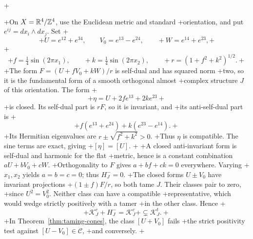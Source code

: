 +\begin{example}\label{ex:strict-cones}
+On \(X=\mathbb R^4/\mathbb Z^4\), use the Euclidean metric and standard
+orientation, and put \(e^{ij}=dx_i\wedge dx_j\). Set
+\[
+ U=e^{12}+e^{34},\qquad V_0=e^{13}-e^{24},\qquad
+ W=e^{14}+e^{23},
+\]
+\[
+ f=\tfrac14\sin(2\pi x_1),\qquad
+ k=\tfrac14\sin(2\pi x_2),\qquad
+ r=(1+f^2+k^2)^{1/2}.
+\]
+The form \(F=(U+fV_0+kW)/r\) is self-dual and has squared norm
+two, so it is the fundamental form of a smooth orthogonal almost
+complex structure \(J\) of this orientation. The form
+\[
+ \eta=U+2f e^{13}+2k e^{23}
+\]
+is closed. Its self-dual part is \(rF\), so it is invariant, and
+its anti-self-dual part is
+\[
+ f(e^{13}+e^{24})+k(e^{23}-e^{14}).
+\]
+Its Hermitian eigenvalues are \(r\pm\sqrt{f^2+k^2}>0\).
+Thus \(\eta\) is compatible. The sine terms are exact, giving
+\([\eta]=[U]\).
+
+A closed anti-invariant form is self-dual and harmonic for the flat
+metric, hence is a constant combination \(aU+bV_0+cW\).
+Orthogonality to \(F\) gives \(a+bf+ck=0\) everywhere. Varying
+\(x_1,x_2\) yields \(a=b=c=0\); thus \(H_J^-=0\).
+The closed forms \(U\pm V_0\) have invariant projections
+\((1\pm f)F/r\), so both tame \(J\). Their classes pair to zero,
+since \(U^2=V_0^2\). Neither class can have a compatible
+representative, which would wedge strictly positively with a tamer
+in the other class. Hence
+\[
+ \mathcal K_J^c+H_J^-=\mathcal K_J^c
+ \subsetneq\mathcal K_J^t.
+\]
+In Theorem~\ref{thm:taming-cones}, the class \([U+V_0]\) fails
+the strict positivity test against \([U-V_0]\in\mathcal C\),
+and conversely.
+\end{example}
